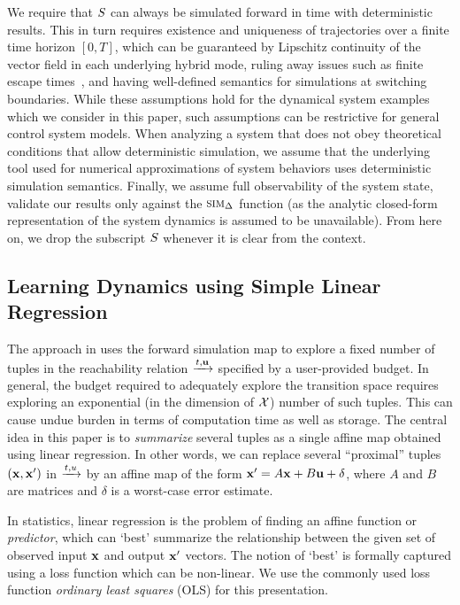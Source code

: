  We require that $S$ can always be
simulated forward in time with deterministic results. This in turn
requires existence and uniqueness of trajectories over a finite time
horizon $[0,T]$, which can be guaranteed by Lipschitz continuity of
the vector field in each underlying hybrid mode, ruling away issues
such as finite escape times~\cite{Meiss/2007/Differential}, and having
well-defined semantics for simulations at switching boundaries. While
these assumptions hold for the dynamical system examples which we
consider in this paper, such assumptions can be restrictive for
general control system models. When analyzing a system that does not
obey theoretical conditions that allow deterministic simulation, we
assume that the underlying tool used for numerical approximations of
system behaviors uses deterministic simulation semantics.  Finally, we
assume full observability of the system state, validate our results
only against the $\mbox{\sc sim}_\Delta$ function (as the analytic closed-form
representation of the system dynamics is assumed to be unavailable).
From here on, we drop the subscript $S$ whenever it is clear
from the context.

\subsection{Learning Dynamics using Simple Linear Regression}

The approach in \cite{zutshi2014multiple} uses the forward simulation
map to explore a fixed number of tuples in the reachability relation
$\xrightarrow{t,\mathbf{u}}$ specified by a user-provided budget.  In general, the
budget required to adequately explore the transition space requires
exploring an exponential (in the dimension of $\mathcal{X}$) number
of such tuples. This can cause undue burden in terms of computation
time as well as storage.  The central idea in this paper is to {\em
summarize} several tuples as a single affine map obtained using linear
regression.  In other words, we can replace several ``proximal''
tuples $(\mathbf{x},\mathbf{x}')$ in $\xrightarrow{t,u}$ by an affine map of the form
$\mathbf{x}' = A\mathbf{x} + B\mathbf{u} + \delta$, where $A$ and $B$ are matrices and
$\delta$ is a worst-case error estimate.

In statistics, linear regression is the problem of finding an affine
function or \textit{predictor}, which can `best' summarize the
relationship between the given set of observed input $\mathbf{x}$ and output
$\mathbf{x}'$ vectors. The notion of `best' is formally captured using a loss
function which can be non-linear. We use the commonly used loss
function \textit{ordinary least squares} (OLS) for this presentation.


